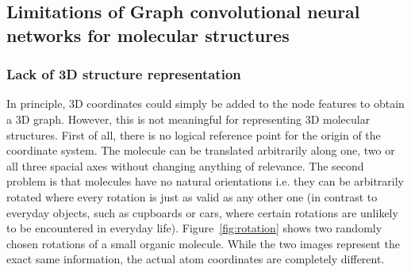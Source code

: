 \subsection{Limitations of Graph convolutional neural networks for molecular structures}
\label{sec:limitations}

\subsubsection{Lack of 3D structure representation}
\label{sec:lack-of-3d-structure}

In principle, 3D coordinates could simply be added to the node features to obtain a 3D graph. However, this is not meaningful for representing 3D molecular structures. First of all, there is no logical reference point for the origin of the coordinate system. The molecule can be translated arbitrarily along one, two or all three spacial axes without changing anything of relevance. The second problem is that molecules have no natural orientations i.e. they can be arbitrarily rotated where every rotation is just as valid as any other one (in contrast to everyday objects, such as cupboards or cars, where certain rotations are unlikely to be encountered in everyday life). Figure~\ref{fig:rotation} shows two randomly chosen rotations of a small organic molecule. While the two images represent the exact same information, the actual atom coordinates are completely different.


